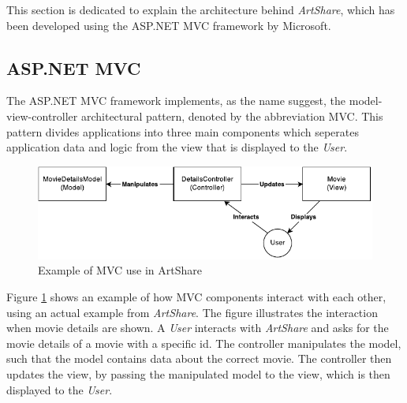\documentclass[../report.tex]{subfiles}
\begin{document}
\graphicspath{{img/}{../img/}}

This section is dedicated to explain the architecture behind \textit{ArtShare}, which has been developed using the ASP.NET MVC framework by Microsoft\cite{microsoft2014}. 


\subsection{ASP.NET MVC}

The ASP.NET MVC framework implements, as the name suggest, the model-view-controller architectural pattern, denoted by the abbreviation MVC. This pattern divides applications into three main components which seperates application data and logic from the view that is displayed to the \textit{User}. 


\begin{figure}[H]
\includegraphics[width=\linewidth]{mvc.pdf}
\caption{Example of MVC use in ArtShare}
\label{fig:mvc}
\end{figure}

Figure \ref{fig:mvc} shows an example of how MVC components interact with each other, using an actual example from \textit{ArtShare}. The figure illustrates the interaction when movie details are shown. A \textit{User} interacts with \textit{ArtShare} and asks for the movie details of a movie with a specific id. The controller manipulates the model, such that the model contains data about the correct movie. The controller then updates the view, by passing the manipulated model to the view, which is then displayed to the \textit{User}.
\end{document}
